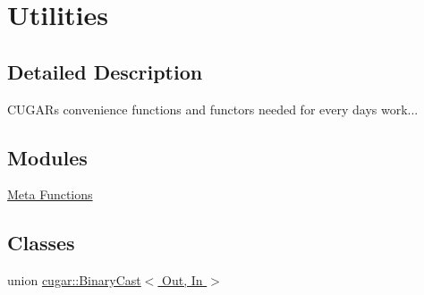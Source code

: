 \hypertarget{group___basic_utils}{}\section{Utilities}
\label{group___basic_utils}


\subsection{Detailed Description}
C\+U\+G\+AR\textquotesingle{}s convenience functions and functors needed for every day\textquotesingle{}s work... \subsection*{Modules}
\begin{DoxyCompactItemize}
\item 
\hyperlink{group___basic_meta_functions}{Meta Functions}
\end{DoxyCompactItemize}
\subsection*{Classes}
\begin{DoxyCompactItemize}
\item 
union \hyperlink{unioncugar_1_1_binary_cast}{cugar\+::\+Binary\+Cast$<$ Out, In $>$}
\end{DoxyCompactItemize}

